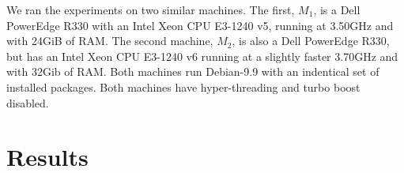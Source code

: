 \documentclass[a4paper]{article}
\newcommand{\bencherseven}{\ensuremath{M_1}\xspace}
\newcommand{\bencherten}{\ensuremath{M_2}\xspace}
\begin{document}

We ran the experiments on two similar machines. The first, \bencherseven, is a
Dell PowerEdge R330 with an Intel Xeon CPU E3-1240 v5, running at 3.50GHz and
with 24GiB of RAM. The second machine, \bencherten, is also a Dell PowerEdge
R330, but has an Intel Xeon CPU E3-1240 v6 running at a slightly faster 3.70GHz
and with 32Gib of RAM. Both machines run Debian-9.9 with an indentical set of
installed packages. Both machines have hyper-threading and turbo boost
disabled.

\section{Results}
\label{sec:results}






\end{document}
